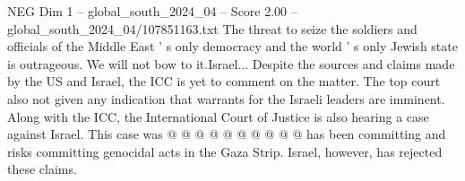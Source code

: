 \begin{textsample}{NEG Dim 1 – global\_south\_2024\_04 – Score 2.00 – global\_south\_2024\_04/107851163.txt}
The threat to seize the soldiers and officials of the Middle East ' s only democracy and the world ' s only Jewish state is outrageous.
We will not bow to it.Israel...
Despite the sources and claims made by the US and Israel, the ICC is yet to comment on the matter.
The top court also not given any indication that warrants for the Israeli leaders are imminent.
Along with the ICC, the International Court of Justice is also hearing a case against Israel.
This case was @ @ @ @ @ @ @ @ @ @ has been committing and risks committing genocidal acts in the Gaza Strip.
Israel, however, has rejected these claims.

\end{textsample}

